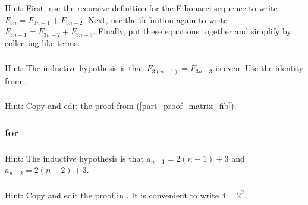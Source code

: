 \subsubsection*{ \answers}
Hint: First, use the recursive definition for the Fibonacci sequence to write $F_{3n}=F_{3n-1} + F_{3n-2}$.  Next, use the definition again to write $F_{3n-1}=F_{3n-2}+F_{3n-3}$. Finally, put these equations together and simplify by collecting like terms.

\subsubsection*{ \answers}
Hint: The inductive hypothesis is that $F_{3(n-1)}=F_{3n-3}$ is even. Use the identity from .

\subsubsection*{ \answers}
Hint: Copy and edit the proof from  (\ref{part_proof_matrix_fib}).

\subsubsection{\answers for  \subpffstrongind}

\subsubsection*{ \answers}
Hint: The inductive hypothesis is that $a_{n-1}=2(n-1)+3$ and $a_{n-2}=2(n-2)+3$.

\subsubsection*{ \answers}
Hint: Copy and edit the proof in .  It is convenient to write $4 = 2^2$.









 



